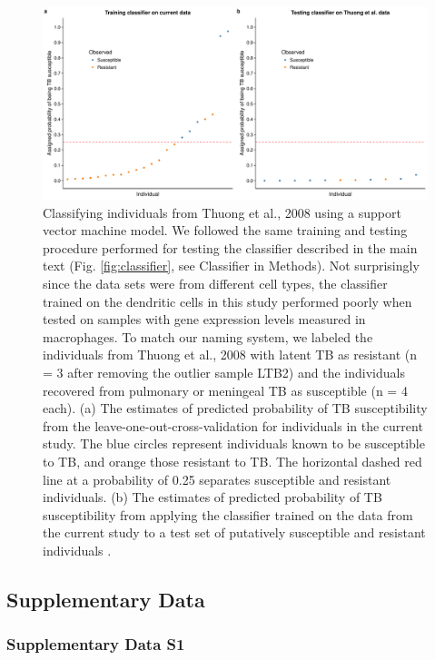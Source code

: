 \documentclass[fleqn,10pt]{wlscirep}
\begin{document}
\begin{figure}[ht]
\centering
\includegraphics[width=\linewidth]{../figure/classifier-svm-thuong.pdf}
\caption{
Classifying individuals from Thuong et al., 2008\cite{Thuong2008}
using a support vector machine model. We followed the same training
and testing procedure performed for testing the classifier described
in the main text (Fig. \ref{fig:classifier}, see Classifier in
Methods). Not surprisingly since the data sets were from different
cell types, the classifier trained on the dendritic cells in this
study performed poorly when tested on samples with gene expression
levels measured in macrophages. To match our naming system, we labeled
the individuals from Thuong et al., 2008\cite{Thuong2008} with latent
TB as resistant (n = 3 after removing the outlier sample LTB2) and the
individuals recovered from pulmonary or meningeal TB as susceptible (n
= 4 each). (a) The estimates of predicted probability of TB
susceptibility from the leave-one-out-cross-validation for individuals
in the current study. The blue circles represent individuals known to
be susceptible to TB, and orange those resistant to TB. The horizontal
dashed red line at a probability of 0.25 separates susceptible and
resistant individuals. (b) The estimates of predicted probability of
TB susceptibility from applying the classifier trained on the data
from the current study to a test set of putatively susceptible and
resistant individuals \cite{Thuong2008}.
}
\label{fig:class-svm-thuong}
\end{figure}
\clearpage\newpage
\subsection*{Supplementary Data}

\subsubsection*{Supplementary Data S1}
\end{document}
